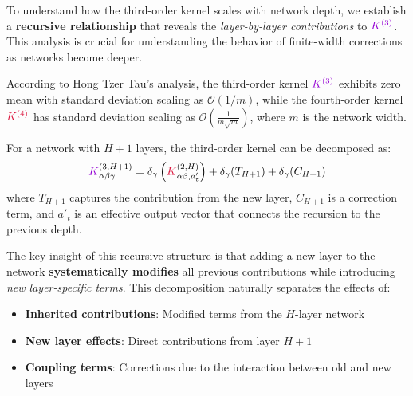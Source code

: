 \documentclass[a4paper]{article}
\theoremstyle{plain}
\theoremstyle{definition}
\theoremstyle{remark}
\begin{document}
To understand how the third-order kernel scales with network depth, we establish a \textbf{recursive relationship} that reveals the \textit{layer-by-layer contributions} to $\textcolor{k3color}{K^{(3)}}$. This analysis is crucial for understanding the behavior of finite-width corrections as networks become deeper.

\begin{tcolorbox}[colback=blue!10,colframe=blue!60!black,title={\textbf{Hong Tzer Tau Scaling Results}},enhanced,drop shadow]
According to Hong Tzer Tau's analysis, the third-order kernel $\textcolor{k3color}{K^{(3)}}$ exhibits zero mean with standard deviation scaling as $\mathcal{O}(1/m)$, while the fourth-order kernel $\textcolor{kernelcolor}{K^{(4)}}$ has standard deviation scaling as $\mathcal{O}(\frac{1}{m \sqrt{m}})$, where $m$ is the network width.
\end{tcolorbox}

\begin{tcolorbox}[colback=theoremcolor!10,colframe=theoremcolor!60!black,title={\textbf{Theorem (Recursive Depth Formula for $\textcolor{k3color}{K^{(3)}}$)}},enhanced,drop shadow]\label{thm:recursive_depth}
For a network with $H+1$ layers, the third-order kernel can be decomposed as:
\begin{equation}
\label{eq:recursive_k3}
\textcolor{k3color}{K}^{(3, H+1)}_{\alpha\beta\gamma} = \delta_\gamma \left(\textcolor{kernelcolor}{K}^{(2,H)}_{\alpha\beta, a'_t} \right) + \delta_\gamma(T_{H+1}) + \delta_\gamma(C_{H+1})
\end{equation}
where $T_{H+1}$ captures the contribution from the new layer, $C_{H+1}$ is a correction term, and $a'_t$ is an effective output vector that connects the recursion to the previous depth.
\end{tcolorbox}

The key insight of this recursive structure is that adding a new layer to the network \textbf{systematically modifies} all previous contributions while introducing \textit{new layer-specific terms}. This decomposition naturally separates the effects of:
\begin{itemize}
\item \textbf{Inherited contributions}: Modified terms from the $H$-layer network
\item \textbf{New layer effects}: Direct contributions from layer $H+1$  
\item \textbf{Coupling terms}: Corrections due to the interaction between old and new layers
\end{itemize}
\end{document}
